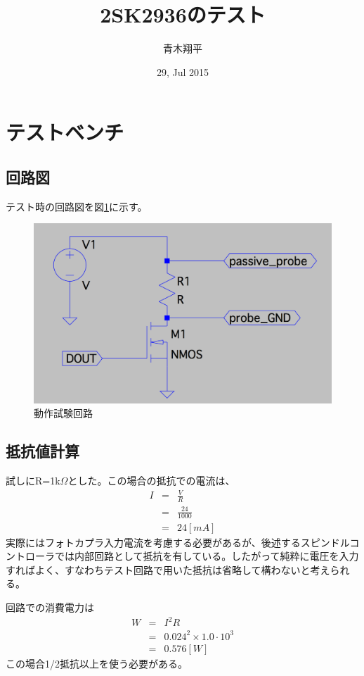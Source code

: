 \documentclass[]{jsarticle}
\begin{document}
\title{2SK2936のテスト}
\author{青木翔平}
\date{29, Jul 2015}
\maketitle

\section{テストベンチ}
\subsection{回路図}
テスト時の回路図を図\ref{testbench}に示す。


\begin{figure}[htbp]
\centering
\includegraphics[width=130mm]{./image/testbench.pdf}
\caption{動作試験回路}
\label{testbench}
\end{figure}

\subsection{抵抗値計算}
試しにR=1k$\Omega$とした。この場合の抵抗での電流は、
\begin{eqnarray*}
I & = &  \frac{V}{R} \\
   & = & \frac{24}{1000} \\
   & = & 24 [mA]
\end{eqnarray*}
実際にはフォトカプラ入力電流を考慮する必要があるが、後述するスピンドルコントローラでは内部回路として抵抗を有している。したがって純粋に電圧を入力すればよく、すなわちテスト回路で用いた抵抗は省略して構わないと考えられる。

回路での消費電力は
\begin{eqnarray*}
W & = &  I^{2} R \\
            & = & 0.024^{2} \times 1.0 \cdot 10^{3} \\
            & = & 0.576 [W]
\end{eqnarray*}
この場合1/2抵抗以上を使う必要がある。
\end{document}
